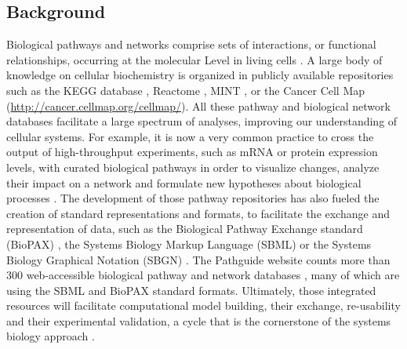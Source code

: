 \documentclass[11pt]{bmc_article_s50}
\newenvironment{bmcformat}{\begin{raggedright}\baselineskip20pt\sloppy\setboolean{publ}{false}}{\end{raggedright}\baselineskip20pt\sloppy}
\begin{document}
\begin{bmcformat}
\section*{Background}

Biological pathways and networks comprise sets of interactions, or functional
relationships, occurring at the molecular Level in living cells
\cite{adriaens2008public, cary2005pathway}.
A large body of knowledge on cellular biochemistry is organized in publicly available
repositories such as the KEGG database \cite{ogata1999kegg}, Reactome
\cite{joshi2005reactome}, MINT \cite{zanzoni2002mint}, or the Cancer Cell Map
(\url{http://cancer.cellmap.org/cellmap/}). All these pathway and biological
network databases facilitate a large spectrum of analyses, improving our
understanding of cellular systems. For example, it is now a very common
practice to cross the output of high-throughput experiments, such as mRNA or
protein expression levels, with curated biological pathways in
order to visualize changes, analyze their impact on a network and
formulate new hypotheses about
biological processes \cite{saraiya2005visualizing,
gehlenborg2010visualization}. The development of those pathway repositories has
also fueled the creation of standard representations and formats, to facilitate
the exchange and representation of data, such as the Biological Pathway
Exchange standard (BioPAX) \cite{demir2010biopax}, the Systems Biology Markup
Language (SBML) \cite{hucka2003systems} or the Systems Biology Graphical
Notation (SBGN) \cite{le2009systems}. The Pathguide website counts
more than 300 web-accessible biological pathway and network databases
\cite{bader2006pathguide}, many of which are using the SBML and BioPAX standard
formats. Ultimately, those integrated resources will facilitate computational
model building, their exchange, re-usability and their experimental validation, a cycle that is the
cornerstone of the systems biology approach \cite{karlebach2008modelling,
kitano2002systems, ideker2001new}.


\end{bmcformat}
\end{document}
